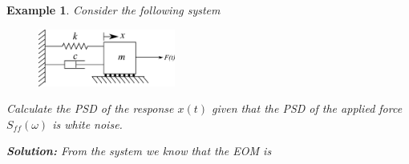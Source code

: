 \documentclass[12pt,letter]{article}
\newtheorem{ex}{Example}
\numberwithin{ex}{section} %
\newenvironment{example}{\begin{mdframed}[middlelinewidth=0.5mm]\begin{ex}\normalfont}{\end{ex}\end{mdframed}}
\numberwithin{re}{section} %
\begin{document}
\begin{example}

Consider the following system

\begin{figure}[H]
	\centering
	\includegraphics[width=0.4\textwidth]{../Figures/forced_spring_mass_damper_system.png}
\end{figure}

Calculate the PSD of the response $x(t)$ given that the PSD of the applied force $S_{ff}(\omega)$ is white noise. 

\noindent\textbf{Solution:} From the system we know that the EOM is 


\end{example}
\end{document}
